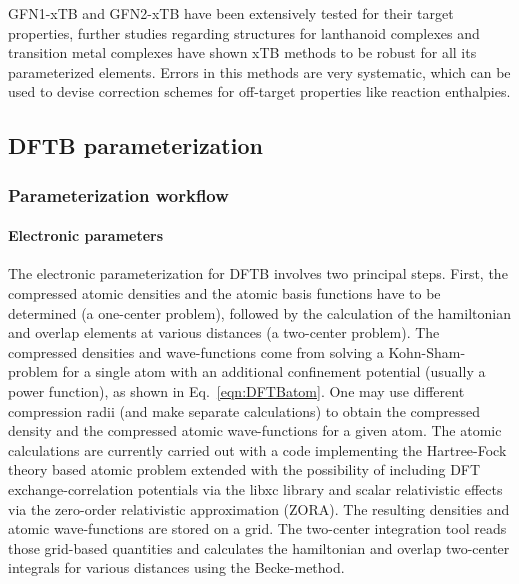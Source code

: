 \documentclass{revtex4-1}
\begin{document}
GFN1-xTB and GFN2-xTB have been extensively tested for their target
properties,\cite{bannwarth2019} further studies regarding structures for
lanthanoid complexes\cite{bursch2017} and transition metal
complexes\cite{bursch2019} have shown xTB methods to be robust for all its
parameterized elements.  Errors in this methods are very systematic, which can
be used to devise correction schemes for off-target properties like reaction
enthalpies.\cite{kromann2018}

\subsection{DFTB parameterization}

\subsubsection{Parameterization workflow}

\paragraph{Electronic parameters}

The electronic parameterization for DFTB involves two principal steps. First,
the compressed atomic densities and the atomic basis functions have to be
determined (a one-center problem), followed by the calculation of the
hamiltonian and overlap elements at various distances (a two-center
problem). The compressed densities and wave-functions come from solving a
Kohn-Sham-problem for a single atom with an additional confinement potential
(usually a power function), as shown in Eq.~\eqref{eqn:DFTBatom}.  One may use
different compression radii (and make separate calculations) to obtain the
compressed density and the compressed atomic wave-functions for a given
atom. The atomic calculations are currently carried out with a code implementing
the Hartree-Fock theory based atomic problem \cite{roothan-rmp-1960a,
  roothan-rmp-1960b} extended with the possibility of including DFT
exchange-correlation potentials via the libxc library\cite{libxc} and scalar
relativistic effects via the zero-order relativistic approximation
(ZORA).\cite{vanLenthe1993} The resulting densities and atomic wave-functions
are stored on a grid. The two-center integration tool reads those grid-based
quantities and calculates the hamiltonian and overlap two-center integrals for
various distances using the Becke-method.\cite{becke-jcp-1988}
\end{document}
